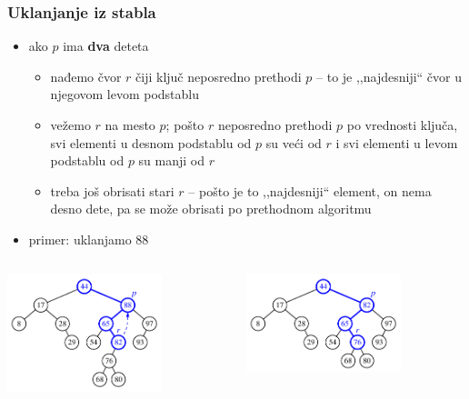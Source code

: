 \documentclass[compress]{beamer}
\begin{document}
\begin{frame}[fragile]
  \frametitle{Uklanjanje iz stabla}
  \begin{itemize}
    \item ako $p$ ima \textbf{dva} deteta
    \begin{itemize}
      \item nađemo čvor $r$ čiji ključ neposredno prethodi $p$ -- to je ,,najdesniji`` čvor u njegovom levom podstablu
      \item vežemo $r$ na mesto $p$; pošto $r$ neposredno prethodi $p$ po vrednosti ključa, svi elementi u desnom podstablu od $p$ su veći od $r$ i svi elementi u levom podstablu od $p$ su manji od $r$
      \item treba još obrisati stari $r$ -- pošto je to ,,najdesniji`` element, on nema desno dete, pa se može obrisati po prethodnom algoritmu
    \end{itemize}
    \item primer: uklanjamo 88
  \end{itemize}
  \begin{columns}
    \begin{column}[c]{6cm}
      \begin{center}
        \includegraphics[width=4.5cm]{asp-11-pic07a.pdf}
      \end{center}
    \end{column}  
    \begin{column}[c]{6cm}
      \begin{center}
        \includegraphics[width=4.5cm]{asp-11-pic07b.pdf}
      \end{center}
    \end{column}  
  \end{columns}
\end{frame}
\end{document}
